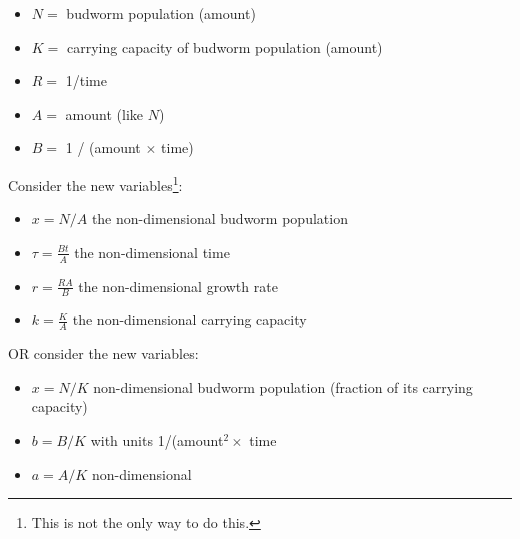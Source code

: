\documentclass{workbook}
\begin{document}
\begin{solution}
\begin{slide}

\begin{parts}
	\item \begin{itemize}
		\item $N =$ budworm population (amount)
		\item $ K =$  carrying capacity of budworm population (amount)
		\item $R =$ 1/time 
		\item $A =$  amount (like $N$)
		\item $B =$ 1 / (amount $\times$ time)
 	\end{itemize}
 	
 	\item Consider the new variables\footnote{This is not the only way to do this.}:
		\begin{itemize}
			\item $x = N/A$ the non-dimensional budworm population
			\item $\tau = \frac{Bt}{A}$ the non-dimensional time
			\item $r = \frac{RA}{B}$ the non-dimensional growth rate
			\item $k = \frac{K}{A}$ the non-dimensional carrying capacity
		\end{itemize}


	OR consider the new variables:
	\begin{itemize}
		\item $x = N/K$ non-dimensional budworm population (fraction of its carrying capacity)
		\item $b = B/K$ with units 1/(amount$^2 \times$ time
		\item $a = A/K$ non-dimensional
	\end{itemize}
\end{parts}	
	
\end{slide}
\end{solution}
\end{document}

